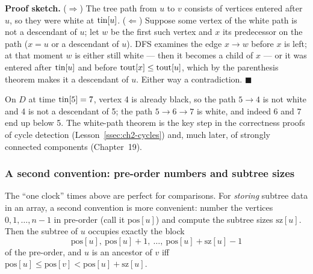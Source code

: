 \textbf{Proof sketch.} ($\Rightarrow$) The tree path from $u$ to $v$ consists of vertices entered after $u$, so they were white at $\mathrm{tin}[u]$. ($\Leftarrow$) Suppose some vertex of the white path is not a descendant of $u$; let $w$ be the first such vertex and $x$ its predecessor on the path ($x = u$ or a descendant of $u$). DFS examines the edge $x \to w$ before $x$ is left; at that moment $w$ is either still white --- then it becomes a child of $x$ --- or it was entered after $\mathrm{tin}[u]$ and before $\mathrm{tout}[x] \le \mathrm{tout}[u]$, which by the parenthesis theorem makes it a descendant of $u$. Either way a contradiction. \hfill$\blacksquare$

On $D$ at time $\mathrm{tin}[5] = 7$, vertex 4 is already black, so the path $5 \to 4$ is not white and 4 is not a descendant of 5; the path $5 \to 6 \to 7$ is white, and indeed 6 and 7 end up below 5. The white-path theorem is the key step in the correctness proofs of cycle detection (Lesson~\ref{ssec:ch2-cycles}) and, much later, of strongly connected components (Chapter~19).

\subsubsection*{A second convention: pre-order numbers and subtree sizes}

The ``one clock'' times above are perfect for comparisons. For \emph{storing} subtree data in an array, a second convention is more convenient: number the vertices $0, 1, \dots, n-1$ in pre-order (call it $\mathrm{pos}[u]$) and compute the subtree sizes $\mathrm{sz}[u]$. Then the subtree of $u$ occupies exactly the block
\[
    \mathrm{pos}[u],\ \mathrm{pos}[u] + 1,\ \dots,\ \mathrm{pos}[u] + \mathrm{sz}[u] - 1
\]
of the pre-order, and $u$ is an ancestor of $v$ iff $\mathrm{pos}[u] \le \mathrm{pos}[v] < \mathrm{pos}[u] + \mathrm{sz}[u]$.

